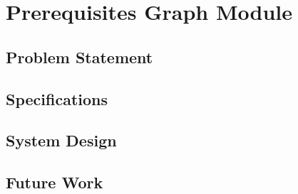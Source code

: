\section{Prerequisites Graph Module}

\subsection{Problem Statement}

\subsection{Specifications}

\subsection{System Design}

\subsection{Future Work}
